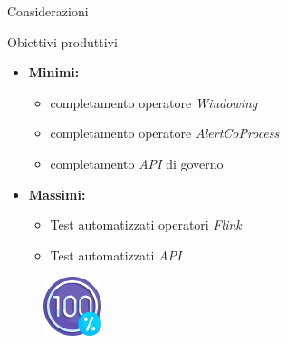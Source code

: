 \documentclass{beamer}
\begin{document}
	\begin{frame}{Considerazioni}
		\begin{block}{Obiettivi produttivi}
			\begin{itemize}
				\item \textbf{Minimi:} 
					\begin{itemize}
						\item completamento operatore \textit{Windowing} \vspace{.5em}
						\item completamento operatore \textit{AlertCoProcess} \vspace{.5em}
						\item completamento \textit{API} di governo \vspace{.5em}
					\end{itemize}
				\item \textbf{Massimi:}
					\begin{itemize}
						\item Test automatizzati operatori \textit{Flink} \vspace{.5em}
						\item Test automatizzati \textit{API} \vspace{.5em}
					\end{itemize}
			\end{itemize}
		\end{block}
		
		\begin{figure}[!h]
    		 \centering
    		\includegraphics[width=1.7cm]{../immagini/slide/100-percent.png}
		\end{figure}
	\end{frame}
	
\end{document}
